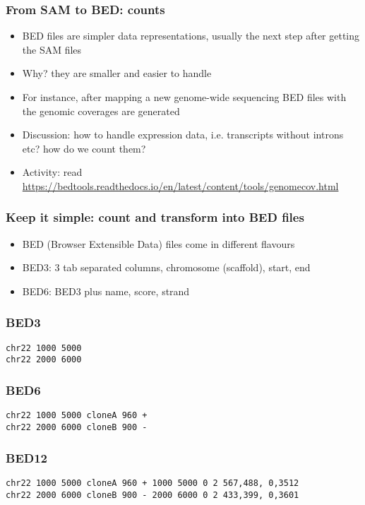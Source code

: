 \documentclass{beamer}
\begin{document}
\begin{frame}
  \frametitle{From SAM to BED: counts}
  \begin{itemize}
  \item BED files are simpler data representations, usually the next step after getting the SAM files
  \item Why? they are smaller and easier to handle
  \item For instance, after mapping a new genome-wide sequencing BED files with the genomic coverages are generated
  \item Discussion: how to handle expression data, i.e. transcripts without introns etc? how do we count them?
  \item Activity: read \url{https://bedtools.readthedocs.io/en/latest/content/tools/genomecov.html}
  \end{itemize}
\end{frame}


\begin{frame}
  \frametitle{Keep it simple: count and transform into BED files}
  \begin{itemize}
  \item BED (Browser Extensible Data) files come in different flavours

  \item BED3: 3 tab separated columns, chromosome (scaffold), start, end

  \item BED6: BED3 plus name, score, strand



  \end{itemize}
\end{frame}



\begin{frame}[fragile]
  \frametitle{BED3}
\begin{verbatim}
chr22 1000 5000
chr22 2000 6000
\end{verbatim}
\end{frame}


\begin{frame}[fragile]
  \frametitle{BED6}
\begin{verbatim}
chr22 1000 5000 cloneA 960 +
chr22 2000 6000 cloneB 900 -
\end{verbatim}
\end{frame}

\begin{frame}[fragile]
  \frametitle{BED12}
\begin{verbatim}
chr22 1000 5000 cloneA 960 + 1000 5000 0 2 567,488, 0,3512
chr22 2000 6000 cloneB 900 - 2000 6000 0 2 433,399, 0,3601
\end{verbatim}
\end{frame}
\end{document}
